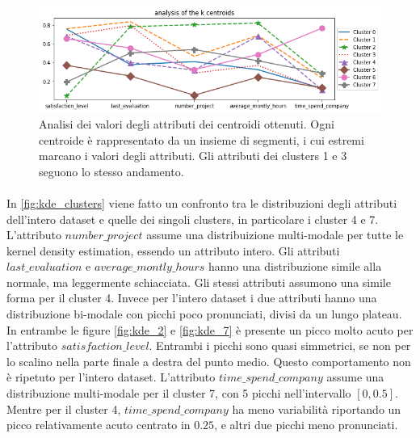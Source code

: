 \documentclass[a4paper]{article}
\begin{document}
\begin{figure}[hbtp]
\centering
\includegraphics[width=0.85\columnwidth]{k-centroids_analysis.png}
\caption{Analisi dei valori degli attributi dei centroidi ottenuti. Ogni centroide è rappresentato da un insieme di segmenti, i cui estremi marcano i valori degli attributi. Gli attributi dei clusters 1 e 3 seguono lo stesso andamento.}
\label{fig:centroids}
\end{figure}

\paragraph{}
In \autoref{fig:kde_clusters} viene fatto un confronto tra le distribuzioni degli attributi dell'intero dataset e quelle dei singoli clusters, in particolare i cluster 4 e 7. L'attributo $number\_project$ assume una distribuizione multi-modale per tutte le kernel density estimation, essendo un attributo intero. Gli attributi $last\_evaluation$ e $average\_montly\_hours$ hanno una distribuzione simile alla normale, ma leggermente schiacciata. Gli stessi attributi assumono una simile forma per il cluster 4. Invece per l'intero dataset i due attributi hanno una distribuzione bi-modale con picchi poco pronunciati, divisi da un lungo plateau. In entrambe le figure \autoref{fig:kde_2} e \autoref{fig:kde_7} è presente un picco molto acuto per l'attributo $satisfaction\_level$. Entrambi i picchi sono quasi simmetrici, se non per lo scalino nella parte finale a destra del punto medio. Questo comportamento non è ripetuto per l'intero dataset. L'attributo $time\_spend\_company$ assume una distribuzione multi-modale per il cluster 7, con 5 picchi nell'intervallo $\left[0, 0.5\right]$. 
Mentre per il cluster 4, 
$time\_spend\_company$ ha meno variabilità riportando un picco relativamente acuto centrato in $0.25$, e altri due picchi meno pronunciati.
\end{document}
